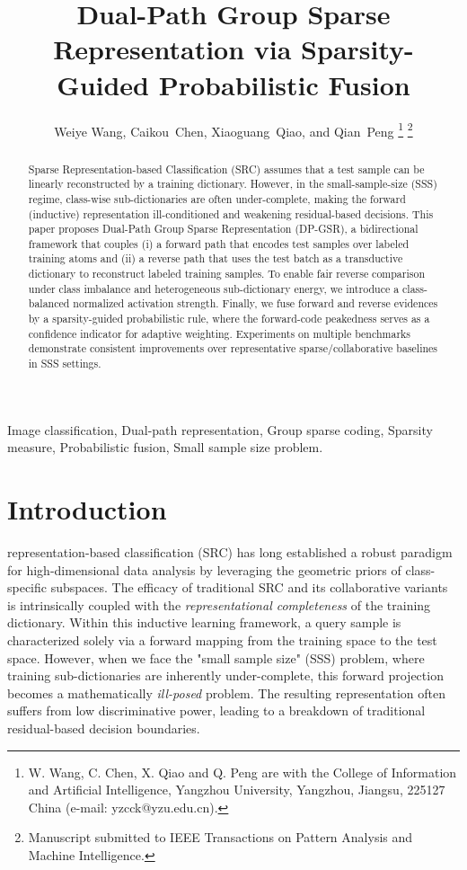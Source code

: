 \documentclass[10pt,comsoc]{IEEEtran}
\title{Dual-Path Group Sparse Representation via Sparsity-Guided Probabilistic Fusion}
\author{Weiye Wang, Caikou~Chen, Xiaoguang~Qiao, and Qian~Peng%
\thanks{W. Wang, C. Chen, X. Qiao and Q. Peng are with the College of Information and Artificial Intelligence, Yangzhou University, Yangzhou, Jiangsu, 225127 China (e-mail: yzcck@yzu.edu.cn).}%
\thanks{Manuscript submitted to IEEE Transactions on Pattern Analysis and Machine Intelligence.}}
\begin{document}
\maketitle

\begin{abstract}
Sparse Representation-based Classification (SRC) assumes that a test sample can be linearly reconstructed by a training dictionary. However, in the small-sample-size (SSS) regime, class-wise sub-dictionaries are often under-complete, making the forward (inductive) representation ill-conditioned and weakening residual-based decisions. This paper proposes Dual-Path Group Sparse Representation (DP-GSR), a bidirectional framework that couples (i) a forward path that encodes test samples over labeled training atoms and (ii) a reverse path that uses the test batch as a transductive dictionary to reconstruct labeled training samples. To enable fair reverse comparison under class imbalance and heterogeneous sub-dictionary energy, we introduce a class-balanced normalized activation strength. Finally, we fuse forward and reverse evidences by a sparsity-guided probabilistic rule, where the forward-code peakedness serves as a confidence indicator for adaptive weighting. Experiments on multiple benchmarks demonstrate consistent improvements over representative sparse/collaborative baselines in SSS settings.
\end{abstract}

\begin{IEEEkeywords}
Image classification, Dual-path representation, Group sparse coding, Sparsity measure, Probabilistic fusion, Small sample size problem.
\end{IEEEkeywords}


\section{Introduction}
 representation-based classification (SRC) \cite{wright2009robust} has long established a robust paradigm for high-dimensional data analysis by leveraging the geometric priors of class-specific subspaces. The efficacy of traditional SRC and its collaborative variants is intrinsically coupled with the \textit{representational completeness} of the training dictionary. Within this inductive learning framework, a query sample is characterized solely via a forward mapping from the training space to the test space. However, when we face the "small sample size" (SSS) problem, where training sub-dictionaries are inherently under-complete, this forward projection becomes a mathematically \textit{ill-posed} problem. The resulting representation often suffers from low discriminative power, leading to a breakdown of traditional residual-based decision boundaries.
\end{document}
